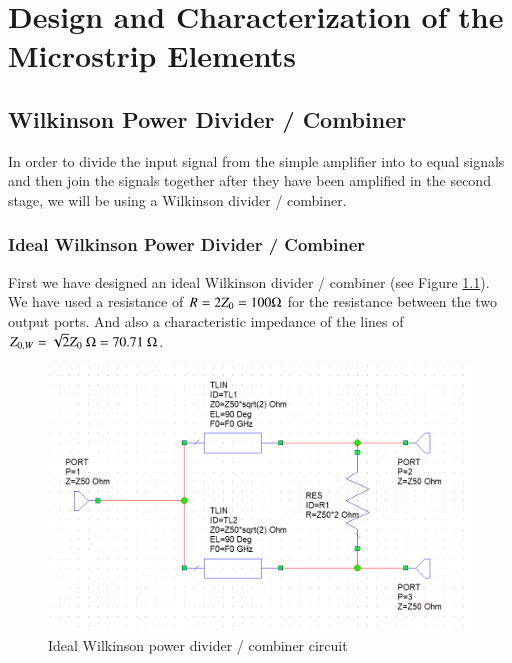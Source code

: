\documentclass[12pt]{report} %
\begin{document}
\chapter{Design and Characterization of the Microstrip Elements}

\section{Wilkinson Power Divider / Combiner}

In order to divide the input signal from the simple amplifier into to equal signals and then join the signals together after they have been amplified in the second stage, we will be using a Wilkinson divider / combiner.

\subsection{Ideal Wilkinson Power Divider / Combiner}

First we have designed an ideal Wilkinson divider / combiner (see Figure \ref{fig:microstrip_elements:wilkinson_ideal_circuit}). We have used a resistance of $R = 2 \* Z_0 = 100 \Omega$ for the resistance between the two output ports. And also a characteristic impedance of the lines of $Z_{0,W} = \sqrt{2} \* Z_0 \ \Omega = 70.71 \ \Omega$.

\begin{figure}[htbp]
    \centering
    \includegraphics[width=\linewidth]{images/microstrip_elements/wilkinson_ideal_circuit.png}
    \caption{Ideal Wilkinson power divider / combiner circuit}
    \label{fig:microstrip_elements:wilkinson_ideal_circuit}
\end{figure}
\end{document}
